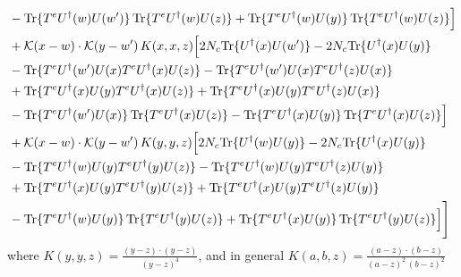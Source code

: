 \documentclass[9pt]{article}
\numberwithin{equation}{section}
\begin{document}
\begin{align}
&-{\rm Tr}\{T^eU^\dagger(w)U(w')\}\,{\rm Tr}\{T^eU^\dagger(w)U(z)\}+{\rm Tr}\{T^eU^\dagger(w)U(y)\}\,{\rm Tr}\{T^eU^\dagger(w)U(z)\}\Big]\notag\\
&+\mathcal K(x-w)\cdot\mathcal K(y-w')\,K(x,x,z)\Big[2 N_{c}{\rm Tr}\{U^\dagger(x)U(w')\}-2 N_{c}{\rm Tr}\{U^\dagger(x)U(y)\}\notag\\
&-{\rm Tr}\{T^eU^\dagger(w')U(x)T^eU^\dagger(x)U(z)\}-{\rm Tr}\{T^eU^\dagger(w')U(x)T^eU^\dagger(z)U(x)\}\notag\\
&+{\rm Tr}\{T^eU^\dagger(x)U(y)T^eU^\dagger(x)U(z)\}+{\rm Tr}\{T^eU^\dagger(x)U(y)T^eU^\dagger(z)U(x)\}\notag\\
&-{\rm Tr}\{T^eU^\dagger(w')U(x)\}\,{\rm Tr}\{T^eU^\dagger(x)U(z)\}-{\rm Tr}\{T^eU^\dagger(x)U(y)\}\,{\rm Tr}\{T^eU^\dagger(x)U(z)\}\Big]\notag\\
&+\mathcal K(x-w)\cdot\mathcal K(y-w')\,K(y,y,z)\Big[2 N_{c}{\rm Tr}\{U^\dagger(w)U(y)\}-2 N_{c}{\rm Tr}\{U^\dagger(x)U(y)\}\notag\\
&-{\rm Tr}\{T^eU^\dagger(w)U(y)T^eU^\dagger(y)U(z)\}-{\rm Tr}\{T^eU^\dagger(w)U(y)T^eU^\dagger(z)U(y)\}\notag\\
&+{\rm Tr}\{T^eU^\dagger(x)U(y)T^eU^\dagger(y)U(z)\}+{\rm Tr}\{T^eU^\dagger(x)U(y)T^eU^\dagger(z)U(y)\}\notag\\
&-{\rm Tr}\{T^eU^\dagger(w)U(y)\}\,{\rm Tr}\{T^eU^\dagger(y)U(z)\}+{\rm Tr}\{T^eU^\dagger(x)U(y)\}\,{\rm Tr}\{T^eU^\dagger(y)U(z)\}\Big]\Bigg]
\end{align}
where $K(y,y,z) = \frac{(y-z)\cdot (y-z)}{(y-z)^{4}}${\color{blue}, and in general $K(a,b,z)=\frac{(a-z)\cdot(b-z)}{(a-z)^{2}\,(b-z)^{2}}$}
\end{document}
